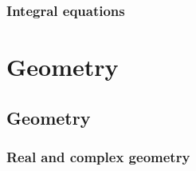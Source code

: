 \documentclass[a4paper]{book}
\begin{document}
    
    

    \section{Integral equations}

    
    
    
	

    \part{Geometry}

    \chapter{Geometry}

    \section{Real and complex geometry}
    
	
	
\end{document}
